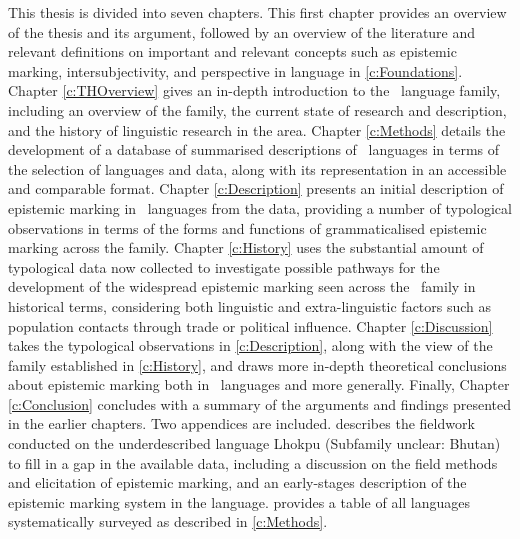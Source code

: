 This thesis is divided into seven chapters. This first chapter provides an overview of the thesis and its argument, followed by an overview of the literature and relevant definitions on important and relevant concepts such as epistemic marking, intersubjectivity, and perspective in language in \cref{c:Foundations}. Chapter \ref{c:THOverview} gives an in-depth introduction to the \lfam\ language family, including an overview of the family, the current state of research and description, and the history of linguistic research in the area. Chapter \ref{c:Methods} details the development of a database of summarised descriptions of \lfam\ languages in terms of the selection of languages and data, along with its representation in an accessible and comparable format. Chapter \ref{c:Description} presents an initial description of epistemic marking in \lfam\ languages from the data, providing a number of typological observations in terms of the forms and functions of grammaticalised epistemic marking across the family. Chapter \ref{c:History} uses the substantial amount of typological data now collected to investigate possible pathways for the development of the widespread epistemic marking seen across the \lfam\ family in historical terms, considering both linguistic and extra-linguistic factors such as population contacts through trade or political influence. Chapter \ref{c:Discussion} takes the typological observations in \cref{c:Description}, along with the view of the family established in \cref{c:History}, and draws more in-depth theoretical conclusions about epistemic marking both in \lfam\ languages and more generally. Finally, Chapter \ref{c:Conclusion} concludes with a summary of the arguments and findings presented in the earlier chapters. Two appendices are included.  describes the fieldwork conducted on the underdescribed language Lhokpu (Subfamily unclear: Bhutan) to fill in a gap in the available data, including a discussion on the field methods and elicitation of epistemic marking, and an early-stages description of the epistemic marking system in the language.  provides a table of all languages systematically surveyed as described in \cref{c:Methods}.

